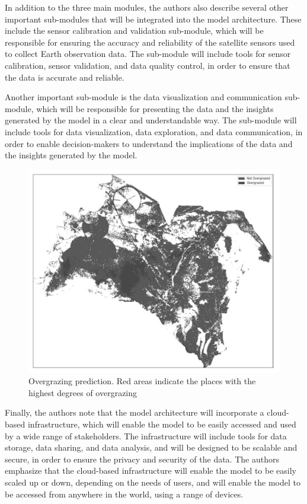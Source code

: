 \documentclass[draft, {\secondLanguage}, english]{volcanica-template}
\begin{document}
In addition to the three main modules, the authors also describe several other important sub-modules that will be integrated into the model architecture. These include the sensor calibration and validation sub-module, which will be responsible for ensuring the accuracy and reliability of the satellite sensors used to collect Earth observation data. The sub-module will include tools for sensor calibration, sensor validation, and data quality control, in order to ensure that the data is accurate and reliable.

Another important sub-module is the data visualization and communication sub-module, which will be responsible for presenting the data and the insights generated by the model in a clear and understandable way. The sub-module will include tools for data visualization, data exploration, and data communication, in order to enable decision-makers to understand the implications of the data and the insights generated by the model.

\begin{figure}[!t]								%
\centering
\includegraphics[width=\textwidth]{Images/fig3-3.png} 
\caption{Overgrazing prediction. Red areas indicate the places with the highest degrees of overgrazing}	
\label{fig:03}									
\end{figure}

Finally, the authors note that the model architecture will incorporate a cloud-based infrastructure, which will enable the model to be easily accessed and used by a wide range of stakeholders. The infrastructure will include tools for data storage, data sharing, and data analysis, and will be designed to be scalable and secure, in order to ensure the privacy and security of the data. The authors emphasize that the cloud-based infrastructure will enable the model to be easily scaled up or down, depending on the needs of users, and will enable the model to be accessed from anywhere in the world, using a range of devices.
\end{document}
